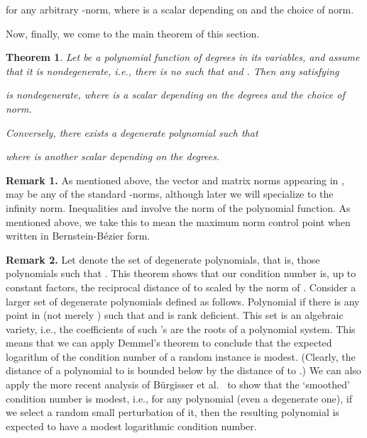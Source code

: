 \documentclass{article}
\newcommand\eref[1]{}
\newtheorem{theorem}{Theorem}[section]
\begin{document}
for any arbitrary -norm, where  is a scalar depending on  and the choice of norm.

Now, finally, we come to the main theorem of this
section.
\begin{theorem}
Let  be a polynomial function of degrees 
 in its  variables, and assume that it
is nondegenerate, i.e., there is no  such that
 and .
Then any  satisfying

is nondegenerate, where  is a scalar depending on the degrees and the choice of norm.

Conversely,
there exists a degenerate 
polynomial  such that

where
 is another scalar depending on the degrees.
\label{thm:disttodegen}
\end{theorem}


\noindent
{\bf Remark 1.} 
As mentioned above, the vector and matrix norms appearing in 
\eref{eq:hatfminusf1}, \eref{eq:hatfminusf2}
may be any of the standard -norms, although later we will specialize
to the infinity norm.
Inequalities \eref{eq:hatfminusf1} and \eref{eq:hatfminusf2} involve
the norm of the polynomial function.  
As mentioned above, we take this to mean the maximum norm control point
when written in Bernstein-B\'ezier form.  

\noindent
{\bf Remark 2.}  Let  denote the set of 
degenerate polynomials, that is, those polynomials 
such that .
This theorem shows that 
our condition number is, up to constant factors,
the reciprocal distance of
 to  scaled by the norm of .
Consider a larger set 
of degenerate polynomials defined as follows.
Polynomial  if
there is any point  in  (not merely )
such that  and  is rank deficient. This set 
 is an algebraic variety, i.e., the coefficients of such 's are
the roots of a polynomial system.  This means that we can apply
Demmel's theorem \cite{Demmel} to conclude that the 
expected logarithm of
the condition number of a random instance is modest. (Clearly, the distance of 
a polynomial  to
 is bounded below by the distance of  to .)
 We can also apply the more
recent analysis of B\"urgisser et al.\ \cite{burgisser}
to show that the `smoothed'
condition number \cite{spielman} is modest, i.e., for any polynomial 
(even a degenerate one), if we select a random small perturbation
of it, then the resulting polynomial is expected to have
a modest logarithmic condition number.
\end{document}
